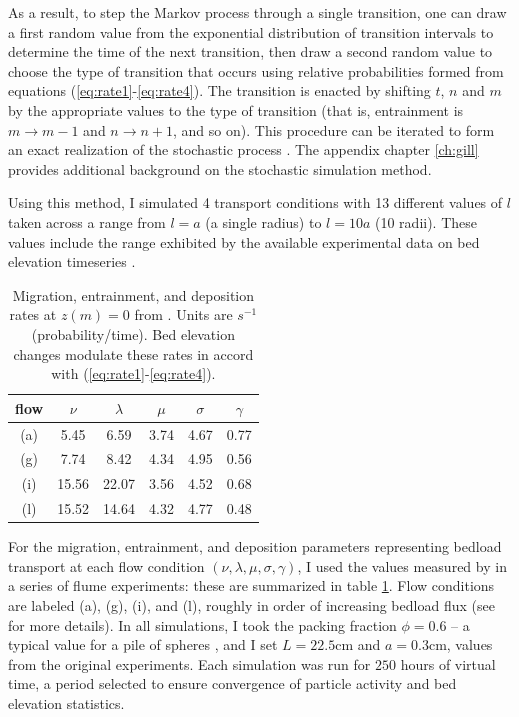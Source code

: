 As a result, to step the Markov process through a single transition, one can draw a first random value from the exponential distribution of transition intervals to determine the time of the next transition,
then draw a second random value to choose the type of transition that occurs using relative probabilities formed from equations (\ref{eq:rate1}-\ref{eq:rate4}). The transition is enacted by shifting $t$, $n$ and $m$ by the appropriate values to the type of transition (that is, entrainment is $m\rightarrow m-1$ and $n \rightarrow n+1$, and so on).
This procedure can be iterated to form an exact realization of the stochastic process \citep{Gillespie2007}.
The appendix chapter \ref{ch:gill} provides additional background on the stochastic simulation method.

Using this method, I simulated 4 transport conditions with 13 different values of $l$ taken across a range from $l=a$ (a single radius) to $l=10a$ (10 radii).
These values include the range exhibited by the available experimental data on bed elevation timeseries \citep{Wong2007,Singh2009,Martin2014}.

\begin{table}
	\caption{Migration, entrainment, and deposition rates at $z(m)=0$ from \citet{Ancey2008}. Units are $s^{-1}$ (probability/time). Bed elevation changes modulate these rates in accord with (\ref{eq:rate1}-\ref{eq:rate4}).}\label{tab:anceyparams}
	\begin{tabular}{cccccc} \\ 
		\toprule  
		flow & $\nu$ & $\lambda$ & $\mu$ & $\sigma$ & $\gamma$ \\
		\midrule
		(a) & 5.45  & 6.59  & 3.74 & 4.67 & 0.77 \\
		\midrule
		(g) & 7.74  & 8.42  & 4.34 & 4.95 & 0.56 \\
		\midrule
		(i) & 15.56 & 22.07 & 3.56 & 4.52 & 0.68 \\
		\midrule
		(l) & 15.52 & 14.64 & 4.32 & 4.77 & 0.48 \\
		\bottomrule
	\end{tabular}
\end{table}
For the migration, entrainment, and deposition parameters representing bedload transport at each flow condition $(\nu, \lambda, \mu, \sigma, \gamma)$, I used the values measured by \citet{Ancey2008} in a series of flume experiments: these are summarized in table \ref{tab:anceyparams}.
Flow conditions are labeled (a), (g), (i), and (l), roughly in order of increasing bedload flux (see \citet{Ancey2008} for more details). 
In all simulations, I took the packing fraction $\phi = 0.6$ -- a typical value for a pile of spheres \citep[e.g.,][]{Bennett1972}, and I set $L = 22.5$cm and $a = 0.3$cm, values from the original \citet{Ancey2008} experiments.
Each simulation was run for $250$ hours of virtual time, a period selected to ensure convergence of particle activity and bed elevation statistics.

